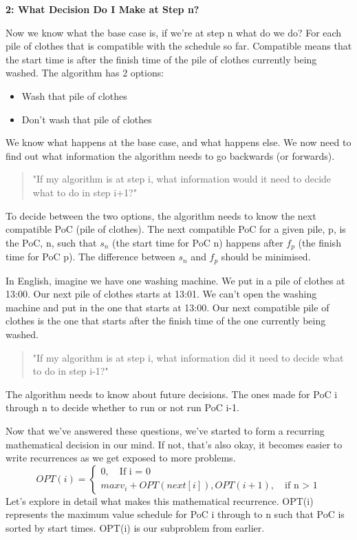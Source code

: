 \documentclass{article}
\begin{document}
\textbf{2: What Decision Do I Make at Step n?}

Now we know what the base case is, if we're at step n what do we do? For each pile of clothes that is compatible with the schedule so far. Compatible means that the start time is after the finish time of the pile of clothes currently being washed. The algorithm has 2 options:
\begin{itemize}
    \item Wash that pile of clothes
    \item Don't wash that pile of clothes
\end{itemize}
We know what happens at the base case, and what happens else. We now need to find out what information the algorithm needs to go backwards (or forwards).
\begin{quote}
    "If my algorithm is at step i, what information would it need to decide what to do in step i+1?"
\end{quote}
To decide between the two options, the algorithm needs to know the next compatible PoC (pile of clothes). The next compatible PoC for a given pile, p, is the PoC, n, such that $s_n$ (the start time for PoC n) happens after $f_p$ (the finish time for PoC p). The difference between $s_n$ and $f_p$ should be minimised.

In English, imagine we have one washing machine. We put in a pile of clothes at 13:00. Our next pile of clothes starts at 13:01. We can't open the washing machine and put in the one that starts at 13:00. Our next compatible pile of clothes is the one that starts after the finish time of the one currently being washed.
\begin{quote}
    "If my algorithm is at step i, what information did it need to decide what to do in step i-1?"
\end{quote}
The algorithm needs to know about future decisions. The ones made for PoC i through n to decide whether to run or not run PoC i-1. 

Now that we’ve answered these questions, we’ve started to form a  recurring mathematical decision in our mind. If not, that’s also okay, it becomes easier to write recurrences as we get exposed to more problems.
$$  OPT(i) = \begin{cases} 0, \quad \text{If i = 0} \\ max{v_i + OPT(next[i]), OPT(i+1)},  \quad \text{if n > 1} \end{cases}$$
Let's explore in detail what makes this mathematical recurrence. OPT(i) represents the maximum value schedule for PoC i through to n such that PoC is sorted by start times. OPT(i) is our subproblem from earlier.
\end{document}
